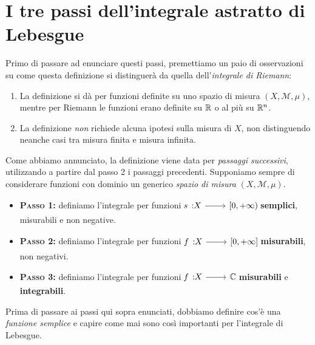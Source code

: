 \section{I tre passi dell'integrale astratto di Lebesgue}
Primo di passare ad enunciare questi passi, premettiamo un paio di osservazioni su come questa definizione si distinguerà da quella dell'\textit{integrale di Riemann}:
\begin{enumerate}
	\item La definizione si dà per funzioni definite su uno spazio di misura $\left(X,\mathcal{M},\mu\right)$, mentre per Riemann le funzioni erano definite su $\mathbb{R}$ o al più su $\mathbb{R}^n$.	
	\item La definizione \textit{non} richiede alcuna ipotesi sulla misura di $X$, non distinguendo neanche casi tra misura finita e misura infinita.
\end{enumerate}
Come abbiamo annunciato, la definizione viene data per \textit{passaggi successivi}, utilizzando a partire dal passo 2 i passaggi precedenti. Supponiamo sempre di considerare funzioni con dominio un generico \textit{spazio di misura} $\left(X,\mathcal{M},\mu\right)$.
\begin{itemize}
	\item \textbf{\textsc{Passo 1:}} definiamo l'integrale per funzioni $\funz{s}{X}{\left[0,+\infty\right)}$ \textbf{semplici}, misurabili e non negative.
	\item \textbf{\textsc{Passo 2:}} definiamo l'integrale per funzioni
	$\funz{f}{X}{\left[0,+\infty\right]}$ \textbf{misurabili}, non negativi.
	\item \textbf{\textsc{Passo 3:}} definiamo l'integrale per funzioni $\funz{f}{X}{\complexset}$ \textbf{misurabili} e \textbf{integrabili}.
\end{itemize}
Prima di passare ai passi qui sopra enunciati, dobbiamo definire cos'è una \textit{funzione semplice} e capire come mai sono così importanti per l'integrale di Lebesgue.
